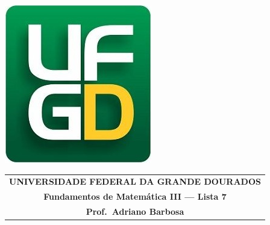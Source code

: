 \documentclass[a4paper,5pt]{amsbook}
\begin{document}
\thispagestyle{empty}
\pagestyle{empty}
\begin{minipage}[h]{0.14\textwidth}
	\includegraphics[scale=0.24]{../ufgd.png}
\end{minipage}
\begin{minipage}[h]{\textwidth}
\begin{tabular}{c}
{{\bf UNIVERSIDADE FEDERAL DA GRANDE DOURADOS}}\\
{{\bf Fundamentos de Matem\'{a}tica III --- Lista 7}}\\
{{\bf Prof.\ Adriano Barbosa}}\\
\end{tabular}
\vspace{-0.45cm}
%
\end{minipage}

\end{document}
